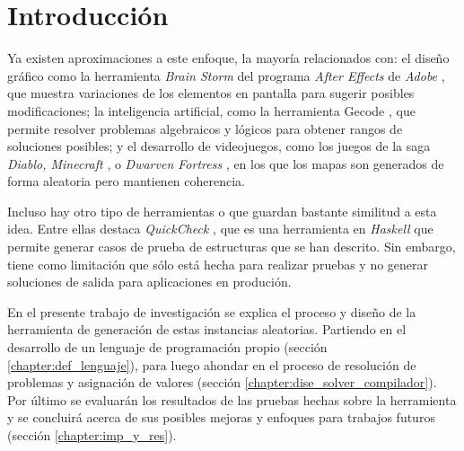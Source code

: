 \chapter*{Introducción}


\label{sect:justificacion}

Ya existen aproximaciones a este enfoque, la mayoría relacionados con: el diseño gráfico como 
la herramienta \emph{Brain Storm} del programa \emph{After Effects} de \emph{Adobe} \cite{HR10}, que muestra variaciones de los
elementos en pantalla para sugerir posibles modificaciones; la inteligencia artificial, como 
la herramienta Gecode \cite{Gecode}, que permite resolver problemas algebraicos y lógicos para obtener
rangos de soluciones posibles; y el desarrollo de videojuegos, como los juegos de la saga
\emph{Diablo, Minecraft} \cite{B12}, o \emph{Dwarven Fortress} \cite{D08}, en los que los mapas son generados de forma aleatoria
pero mantienen coherencia.

Incluso hay otro tipo de herramientas o que guardan bastante similitud a esta idea.
Entre ellas destaca \emph{QuickCheck} \cite{TQP}, que es una herramienta en \emph{Haskell} que 
permite generar casos de prueba de estructuras que se han descrito. Sin embargo, tiene
como limitación que sólo está hecha para realizar pruebas y no generar soluciones de
salida para aplicaciones en produción.

En el presente trabajo de investigación se explica el proceso y diseño de la herramienta de generación
de estas instancias aleatorias. Partiendo en el desarrollo de un lenguaje de
programación propio (sección \ref{chapter:def_lenguaje}), para luego ahondar en el proceso de resolución de
problemas y asignación de valores (sección \ref{chapter:dise_solver_compilador}). Por último se evaluarán los resultados de
las pruebas hechas sobre la herramienta y se concluirá acerca de sus posibles mejoras y
enfoques para trabajos futuros (sección \ref{chapter:imp_y_res}).
